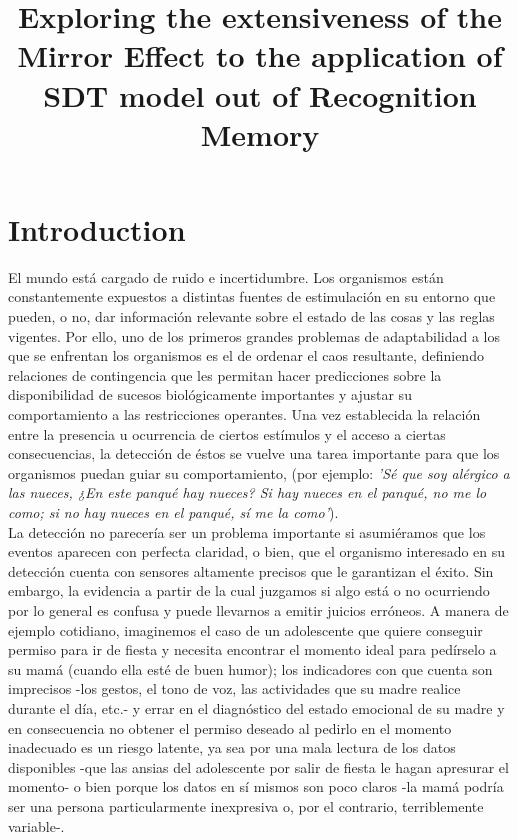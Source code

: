 \documentclass[jou,apacite]{apa6}
\title{Exploring the extensiveness of the Mirror Effect to the application of SDT model out of Recognition Memory}
\begin{document}
\maketitle 

\section{Introduction}

El mundo está cargado de ruido e incertidumbre. Los organismos están constantemente expuestos a distintas fuentes de estimulación en su entorno que pueden, o no, dar información relevante sobre el estado de las cosas y las reglas vigentes. Por ello, uno de los primeros grandes problemas de adaptabilidad a los que se enfrentan los organismos es el de ordenar el caos resultante, definiendo relaciones de contingencia que les permitan hacer predicciones sobre la disponibilidad de sucesos biológicamente importantes y ajustar su comportamiento a las restricciones operantes. Una vez establecida la relación entre la presencia u ocurrencia de ciertos estímulos y el acceso a ciertas consecuencias, la detección de éstos se vuelve una tarea importante para que los organismos puedan guiar su comportamiento, (por ejemplo: \textit{'Sé que soy alérgico a las nueces, ¿En este panqué hay nueces? Si hay nueces en el panqué, no me lo como; si no hay nueces en el panqué, sí me la como'}).\\


La detección no parecería ser un problema importante si asumiéramos que los eventos aparecen con perfecta claridad, o bien, que el organismo interesado en su detección cuenta con sensores altamente precisos que le garantizan el éxito. Sin embargo, la evidencia a partir de la cual juzgamos si algo está o no ocurriendo por lo general es confusa y puede llevarnos a emitir juicios erróneos. A manera de ejemplo cotidiano, imaginemos el caso de un adolescente que quiere conseguir permiso para ir de fiesta y necesita encontrar el momento ideal para pedírselo a su mamá (cuando ella esté de buen humor); los indicadores con que cuenta son imprecisos -los gestos, el tono de voz, las actividades que su madre realice durante el día, etc.- y errar en el diagnóstico del estado emocional de su madre y en consecuencia no obtener el permiso deseado al pedirlo en el momento inadecuado es un riesgo latente, ya sea por una mala lectura de los datos disponibles -que las ansias del adolescente por salir de fiesta le hagan apresurar el momento- o bien porque los datos en sí mismos son poco claros -la mamá podría ser una persona particularmente inexpresiva o, por el contrario, terriblemente variable-.\\ 
\end{document}
